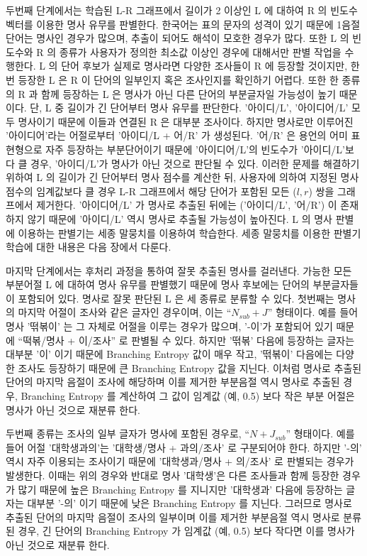 \documentclass[oneside, ko,phd]{snuthesis_utf8_kor}
\begin{document}
두번째 단계에서는 학습된 L-R 그래프에서 길이가 2 이상인 L 에 대하여 R 의 빈도수 벡터를 이용한 명사 유무를 판별한다.
한국어는 표의 문자의 성격이 있기 때문에 1음절 단어는 명사인 경우가 많으며, 추출이 되어도 해석이 모호한 경우가 많다.
또한 L 의 빈도수와 R 의 종류가 사용자가 정의한 최소값 이상인 경우에 대해서만 판별 작업을 수행한다.
L 의 단어 후보가 실제로 명사라면 다양한 조사들이 R 에 등장할 것이지만, 한 번 등장한 L 은 R 이 단어의 일부인지 혹은 조사인지를 확인하기 어렵다.
또한 한 종류의 R 과 함께 등장하는 L 은 명사가 아닌 다른 단어의 부분글자일 가능성이 높기 때문이다.
단, L 중 길이가 긴 단어부터 명사 유무를 판단한다.
'아이디/L', '아이디어/L' 모두 명사이기 때문에 이들과 연결된 R 은 대부분 조사이다.
하지만 명사로만 이루어진 '아이디어'라는 어절로부터 '아이디/L + 어/R' 가 생성된다.
'어/R' 은 용언의 어미 표현형으로 자주 등장하는 부분단어이기 때문에 '아이디어/L'의 빈도수가 '아이디/L'보다 클 경우, '아이디/L'가 명사가 아닌 것으로 판단될 수 있다.
이러한 문제를 해결하기 위하여 L 의 길이가 긴 단어부터 명사 점수를 계산한 뒤, 사용자에 의하여 지정된 명사 점수의 임계값보다 클 경우 L-R 그래프에서 해당 단어가 포함된 모든 ($l, r$) 쌍을 그래프에서 제거한다.
'아이디어/L' 가 명사로 추출된 뒤에는 ('아이디/L', '어/R') 이 존재하지 않기 때문에 '아이디/L' 역시 명사로 추출될 가능성이 높아진다.
L 의 명사 판별에 이용하는 판별기는 세종 말뭉치를 이용하여 학습한다.
세종 말뭉치를 이용한 판별기 학습에 대한 내용은 다음 장에서 다룬다.

마지막 단계에서는 후처리 과정을 통하여 잘못 추출된 명사를 걸러낸다.
가능한 모든 부분어절 L 에 대하여 명사 유무를 판별했기 때문에 명사 후보에는 단어의 부분글자들이 포함되어 있다.
명사로 잘못 판단된 L 은 세 종류로 분류할 수 있다.
첫번째는 명사의 마지막 어절이 조사와 같은 글자인 경우이며, 이는 “$N_{sub} + J$” 형태이다.
예를 들어 명사 '떢볶이' 는 그 자체로 어절을 이루는 경우가 많으며, '-이'가 포함되어 있기 때문에 “떡볶/명사 + 이/조사” 로 판별될 수 있다.
하지만 '떢볶' 다음에 등장하는 글자는 대부분 '이' 이기 때문에 Branching Entropy 값이 매우 작고, '떢볶이' 다음에는 다양한 조사도 등장하기 때문에 큰 Branching Entropy 값을 지닌다.
이처럼 명사로 추출된 단어의 마지막 음절이 조사에 해당하며 이를 제거한 부분음절 역시 명사로 추출된 경우, Branching Entropy 를 계산하여 그 값이 임계값 (예, 0.5) 보다 작은 부분 어절은 명사가 아닌 것으로 재분류 한다.

두번째 종류는 조사의 일부 글자가 명사에 포함된 경우로, “$N + J_{sub}$” 형태이다.
예를 들어 어절 '대학생과의'는 '대학생/명사 + 과의/조사' 로 구분되어야 한다.
하지만 '-의' 역시 자주 이용되는 조사이기 때문에 '대학생과/명사 + 의/조사' 로 판별되는 경우가 발생한다.
이때는 위의 경우와 반대로 명사 '대학생'은 다른 조사들과 함께 등장한 경우가 많기 때문에 높은 Branching Entropy 를 지니지만 '대학생과' 다음에 등장하는 글자는 대부분 '-의' 이기 때문에 낮은 Branching Entropy 를 지닌다.
그러므로 명사로 추출된 단어의 마지막 음절이 조사의 일부이며 이를 제거한 부분음절 역시 명사로 분류된 경우, 긴 단어의 Branching Entropy 가 임계값 (예, 0.5) 보다 작다면 이를 명사가 아닌 것으로 재분류 한다.
\end{document}
